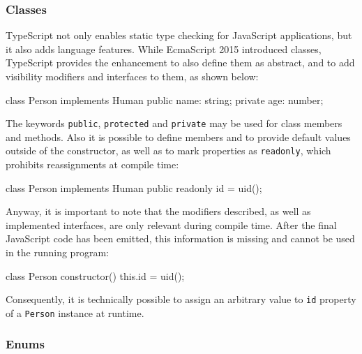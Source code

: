 \subsubsection{Classes}

TypeScript not only enables static type checking for JavaScript applications, but it also adds language features. While EcmaScript 2015 introduced classes, TypeScript provides the enhancement to also define them as abstract, and to add visibility modifiers and interfaces to them, as shown below:
\begin{JsCode}[numbers=none]
class Person implements Human {
  public name: string;
  private age: number;
}
\end{JsCode}
The keywords \texttt{public}, \texttt{protected} and \texttt{private} may be used for class members and methods. Also it is possible to define members and to provide default values outside of the constructor, as well as to mark properties as \texttt{readonly}, which prohibits reassignments at compile time:
\begin{JsCode}[numbers=none]
class Person implements Human {
  public readonly id = uid();
}
\end{JsCode}
Anyway, it is important to note that the modifiers described, as well as implemented interfaces, are only relevant during compile time. After the final JavaScript code has been emitted, this information is missing and cannot be used in the running program:
\begin{JsCode}[numbers=none]
class Person {
  constructor() {
    this.id = uid();
  }
}
\end{JsCode}
Consequently, it is technically possible to assign an arbitrary value to \texttt{id} property of a \texttt{Person} instance at runtime.

\subsubsection{Enums}

